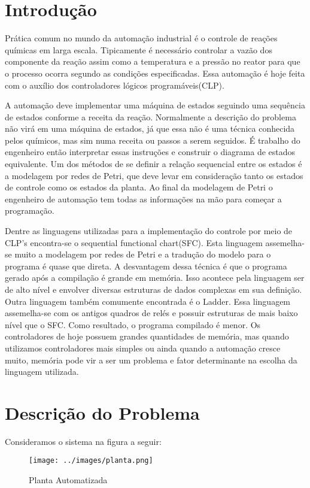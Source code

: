 \section{Introdução}

 Prática comum no mundo da automação industrial é o controle de reações químicas em larga escala. Tipicamente 
é necessário controlar a vazão dos componente da reação assim como  a temperatura e a pressão no reator para que o processo
ocorra segundo as condições especificadas. Essa automação é hoje feita com o auxílio dos controladores lógicos programáveis(CLP).

A automação deve implementar uma máquina de estados seguindo uma sequência de estados conforme a receita da reação. Normalmente a descrição do problema não virá em uma máquina de estados, já que 
essa não é uma técnica conhecida pelos químicos, mas sim numa receita ou passos a serem seguidos. É trabalho do engenheiro
então interpretar essas instruções e construir o diagrama de estados equivalente. Um dos métodos de se definir a relação 
sequencial entre os estados é a modelagem por redes de Petri, que deve levar em consideração tanto os estados de controle como
os estados da planta. Ao final da modelagem de Petri o engenheiro de automação
tem todas as informações na mão para começar a programação.

Dentre as linguagens utilizadas para a implementação do controle por meio de CLP's encontra-se o sequential functional
chart(SFC). Esta linguagem assemelha-se muito a modelagem por redes de Petri e a tradução do modelo para o programa é quase
que direta. A desvantagem dessa técnica é que o programa gerado após a compilação é grande em memória. Isso acontece pela linguagem
ser de alto nível e envolver diversas estruturas de dados complexas em sua definição. Outra linguagem também comumente
encontrada é o Ladder. Essa linguagem assemelha-se com os antigos quadros de relés e possuir estruturas de mais baixo nível que o SFC.
Como resultado, o programa compilado é menor. Os controladores de hoje possuem grandes quantidades de memória, mas quando utilizamos controladores mais simples ou ainda quando a automação cresce muito, memória pode vir a ser um problema e fator determinante na
escolha da linguagem utilizada.

\section{Descrição do Problema}
Consideramos o sistema na figura a seguir:
\begin{figure}[H]
	\centering
	\texttt{[image: ../images/planta.png]}
	\caption{Planta Automatizada}
	\label{fig:planta}
\end{figure}

